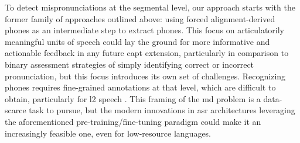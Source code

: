 \documentclass[thesis]{cluu}
\begin{document}
To detect mispronunciations at the segmental level, our approach starts with the former family of approaches outlined above: using forced alignment-derived phones as an intermediate step to extract phones. This focus on articulatorily meaningful units of speech could lay the ground for more informative and actionable feedback in any future \gls{capt} extension, particularly in comparison to binary assessment strategies of simply identifying correct or incorrect pronunciation, but this focus introduces its own set of challenges. Recognizing phones requires fine-grained annotations at that level, which are difficult to obtain, particularly for \gls{l2} speech \parencite{zhangL2GENNeuralPhoneme2022}. This framing of the \gls{md} problem is a data-scarce task to pursue, but the modern innovations in \gls{asr} architectures leveraging the aforementioned pre-training/fine-tuning paradigm could make it an increasingly feasible one, even for low-resource languages.
\end{document}
